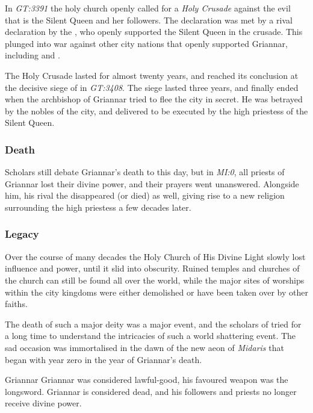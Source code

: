 In \emph{GT:3391} the holy church openly called for a \emph{Holy Crusade}
against the evil that is the Silent Queen and her followers. The declaration
was met by a rival declaration by the , who openly
supported the Silent Queen in the crusade. This plunged 
into war against other city nations that openly supported Griannar, including
 and .

The Holy Crusade lasted for almost twenty years, and reached its conclusion
at the decisive siege of  in \emph{GT:3408}. The
siege lasted three years, and finally ended when the archbishop of Griannar
tried to flee the city in secret. He was betrayed by the nobles of the city,
and delivered to be executed by the high priestess  of the
Silent Queen.

\subsubsection{Death}

Scholars still debate Griannar's death to this day, but in \emph{MI:0}, all
priests of Griannar lost their divine power, and their prayers went
unanswered. Alongside him, his rival the  disappeared
(or died) as well, giving rise to a new religion surrounding the high priestess
 a few decades later.

\subsubsection{Legacy}

Over the course of many decades the Holy Church of His Divine Light slowly
lost influence and power, until it slid into obscurity. Ruined temples and
churches of the church can still be found all over the world, while the major
sites of worships within the city kingdoms were either demolished or have been
taken over by other faiths.

The death of such a major deity was a major event, and the scholars of
 tried for a long time to understand the
intricacies of such a world shattering event. The sad occasion was
immortalised in the dawn of the new aeon of \emph{Midaris} that began with
year zero in the year of Griannar's death.

\begin{35e}{Griannar}
  Griannar was considered lawful-good, his favoured weapon was the longsword.
  Griannar is considered dead, and his followers and priests no longer receive
  divine power.
\end{35e}
